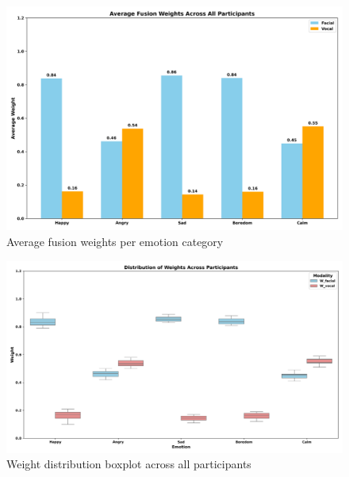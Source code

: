 \begin{figure}[H]
    \centering
    \includegraphics[width=1\textwidth]{img/chapter_04/weights/average_modified_fusion_weights.png}
    \caption{Average fusion weights per emotion category}
    \label{fig:average-fusion-weights}
\end{figure}

\begin{figure}[H]
    \centering
    \includegraphics[width=.9\textwidth]{img/chapter_04/weights/weight_distribution_boxplot.png}
    \caption{Weight distribution boxplot across all participants}
    \label{fig:weight-distribution}
\end{figure}


